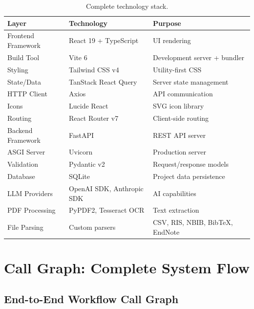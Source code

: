 \documentclass[11pt,a4paper]{article}
\begin{document}
\begin{table}[H]
\centering
\begin{tabular}{lll}
\toprule
\textbf{Layer} & \textbf{Technology} & \textbf{Purpose} \\
\midrule
Frontend Framework & React 19 + TypeScript & UI rendering \\
Build Tool & Vite 6 & Development server + bundler \\
Styling & Tailwind CSS v4 & Utility-first CSS \\
State/Data & TanStack React Query & Server state management \\
HTTP Client & Axios & API communication \\
Icons & Lucide React & SVG icon library \\
Routing & React Router v7 & Client-side routing \\
\midrule
Backend Framework & FastAPI & REST API server \\
ASGI Server & Uvicorn & Production server \\
Validation & Pydantic v2 & Request/response models \\
Database & SQLite & Project data persistence \\
\midrule
LLM Providers & OpenAI SDK, Anthropic SDK & AI capabilities \\
PDF Processing & PyPDF2, Tesseract OCR & Text extraction \\
File Parsing & Custom parsers & CSV, RIS, NBIB, BibTeX, EndNote \\
\bottomrule
\end{tabular}
\caption{Complete technology stack.}
\end{table}

\section{Call Graph: Complete System Flow}

\subsection{End-to-End Workflow Call Graph}
\end{document}
